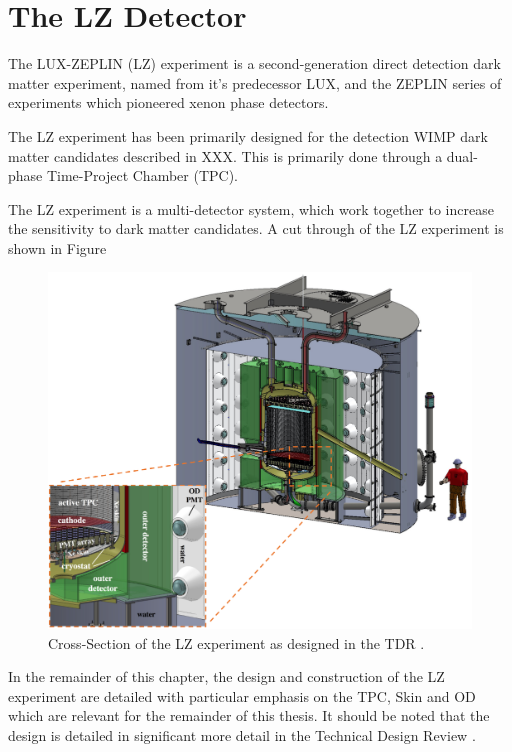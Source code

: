 \section{The LZ Detector}
\par
The LUX-ZEPLIN (LZ) experiment is a second-generation direct detection dark matter experiment, named from it's predecessor LUX, and the ZEPLIN series of experiments which pioneered xenon phase detectors.

The LZ experiment has been primarily designed for the detection WIMP dark matter candidates described in XXX. 
This is primarily done through a dual-phase Time-Project Chamber (TPC).

\par
The LZ experiment is a multi-detector system, which work together to increase the sensitivity to dark matter candidates.
A cut through of the LZ experiment is shown in Figure 

\begin{figure}
    \centering
    \includegraphics[width=\textwidth]{Figures/LZ/LZ_CAD_with_interactions.png}
    \caption{Cross-Section of the LZ experiment as designed in the TDR \cite{LZ_TechnicalDesignReview_ref}.}
    \label{fig:LZ_Cut_CAD}
\end{figure}



\par
In the remainder of this chapter, the design and construction of the LZ experiment are detailed with particular emphasis on the TPC, Skin and OD which are relevant for the remainder of this thesis. 
It should be noted that the design is detailed in significant more detail in the Technical Design Review \cite{LZ_TechnicalDesignReview_ref}.

